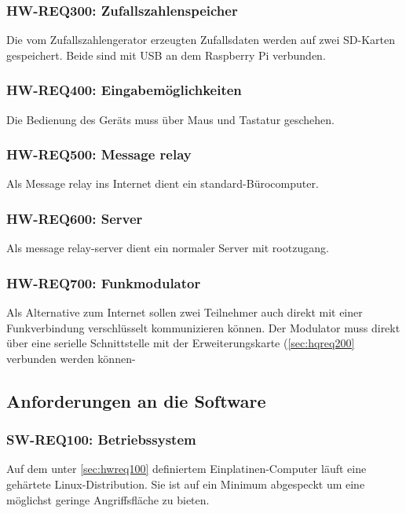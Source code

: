 \subsubsection{HW-REQ300: Zufallszahlenspeicher}
\label{sec:hwreq300}
Die vom Zufallszahlengerator erzeugten Zufallsdaten werden auf zwei SD-Karten
gespeichert. Beide sind mit USB an dem Raspberry Pi verbunden.

\subsubsection{HW-REQ400: Eingabemöglichkeiten}
\label{sec:hwreq400}
Die Bedienung des Geräts muss über Maus und Tastatur geschehen.

\subsubsection{HW-REQ500: Message relay}
\label{sec:hwreq500}
Als Message relay ins Internet dient ein standard-Bürocomputer.

\subsubsection{HW-REQ600: Server}
\label{sec:hwreq600}
Als message relay-server dient ein normaler Server mit rootzugang.

\subsubsection{HW-REQ700: Funkmodulator}
\label{sec:hwreq700}
Als Alternative zum Internet sollen zwei Teilnehmer auch direkt mit einer
Funkverbindung verschlüsselt kommunizieren können. Der Modulator muss direkt
über eine serielle Schnittstelle mit der Erweiterungskarte (\ref{sec:hqreq200}
verbunden werden können-

\subsection{Anforderungen an die Software}
\label{sec:anforderungen-software}

\subsubsection{SW-REQ100: Betriebssystem}
\label{sec:swreq100}
Auf dem unter \ref{sec:hwreq100} definiertem Einplatinen-Computer läuft eine
gehärtete Linux-Distribution. Sie ist auf ein Minimum abgespeckt um eine
möglichst geringe Angriffsfläche zu bieten.

